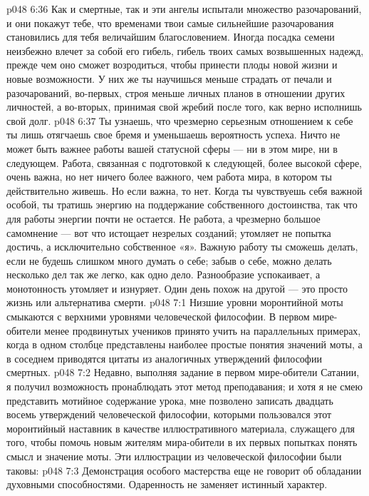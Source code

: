 \vs p048 6:36 Как и смертные, так и эти ангелы испытали множество разочарований, и они покажут тебе, что временами твои самые сильнейшие разочарования становились для тебя величайшим благословением. Иногда посадка семени неизбежно влечет за собой его гибель, гибель твоих самых возвышенных надежд, прежде чем оно сможет возродиться, чтобы принести плоды новой жизни и новые возможности. У них же ты научишься меньше страдать от печали и разочарований, во\hyp{}первых, строя меньше личных планов в отношении других личностей, а во\hyp{}вторых, принимая свой жребий после того, как верно исполнишь свой долг.
\vs p048 6:37 Ты узнаешь, что чрезмерно серьезным отношением к себе ты лишь отягчаешь свое бремя и уменьшаешь вероятность успеха. Ничто не может быть важнее работы вашей статусной сферы --- ни в этом мире, ни в следующем. Работа, связанная с подготовкой к следующей, более высокой сфере, очень важна, но нет ничего более важного, чем работа мира, в котором ты действительно живешь. Но если  важна, то  нет. Когда ты чувствуешь себя важной особой, ты тратишь энергию на поддержание собственного достоинства, так что для работы энергии почти не остается. Не работа, а чрезмерно большое самомнение --- вот что истощает незрелых созданий; утомляет не попытка достичь, а исключительно собственное «я». Важную работу ты сможешь делать, если не будешь слишком много думать о себе; забыв о себе, можно делать несколько дел так же легко, как одно дело. Разнообразие успокаивает, а монотонность утомляет и изнуряет. Один день похож на другой --- это просто жизнь или альтернатива смерти.
\vs p048 7:1 Низшие уровни моронтийной моты смыкаются с верхними уровнями человеческой философии. В первом мире\hyp{}обители менее продвинутых учеников принято учить на параллельных примерах, когда в одном столбце представлены наиболее простые понятия значений моты, а в соседнем приводятся цитаты из аналогичных утверждений философии смертных.
\vs p048 7:2 Недавно, выполняя задание в первом мире\hyp{}обители Сатании, я получил возможность пронаблюдать этот метод преподавания; и хотя я не смею представить мотийное содержание урока, мне позволено записать двадцать восемь утверждений человеческой философии, которыми пользовался этот моронтийный наставник в качестве иллюстративного материала, служащего для того, чтобы помочь новым жителям мира\hyp{}обители в их первых попытках понять смысл и значение моты. Эти иллюстрации из человеческой философии были таковы:
\vs p048 7:3 \bibnobreakspace Демонстрация особого мастерства еще не говорит об обладании духовными способностями. Одаренность не заменяет истинный характер.
